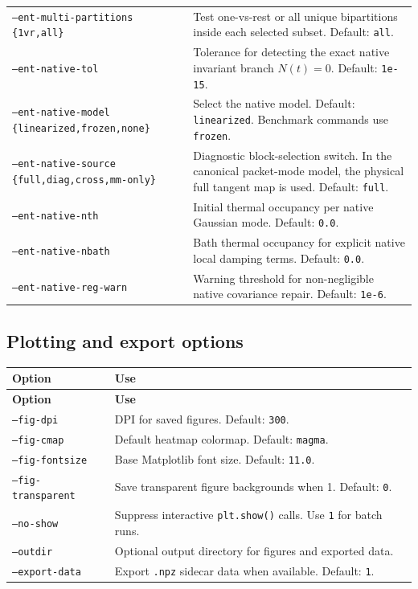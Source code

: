 \documentclass[11pt]{article}
\begin{document}
\begin{longtable}{L{0.31\textwidth}L{0.61\textwidth}}
\texttt{--ent-multi-partitions \{1vr,all\}} & Test one-vs-rest or all unique bipartitions inside each selected subset. Default: \texttt{all}. \\
\texttt{--ent-native-tol} & Tolerance for detecting the exact native invariant branch \(N(t)=0\). Default: \texttt{1e-15}. \\
\texttt{--ent-native-model \{linearized,frozen,none\}} & Select the native model. Default: \texttt{linearized}. Benchmark commands use \texttt{frozen}. \\
\texttt{--ent-native-source \{full,diag,cross,mm-only\}} & Diagnostic block-selection switch. In the canonical packet-mode model, the physical full tangent map is used. Default: \texttt{full}. \\
\texttt{--ent-native-nth} & Initial thermal occupancy per native Gaussian mode. Default: \texttt{0.0}. \\
\texttt{--ent-native-nbath} & Bath thermal occupancy for explicit native local damping terms. Default: \texttt{0.0}. \\
\texttt{--ent-native-reg-warn} & Warning threshold for non-negligible native covariance repair. Default: \texttt{1e-6}. \\
\bottomrule
\end{longtable}

\subsection{Plotting and export options}
\begin{longtable}{L{0.28\textwidth}L{0.64\textwidth}}
\toprule
\textbf{Option} & \textbf{Use} \\
\midrule
\endfirsthead
\toprule
\textbf{Option} & \textbf{Use} \\
\midrule
\endhead
\texttt{--fig-dpi} & DPI for saved figures. Default: \texttt{300}. \\
\texttt{--fig-cmap} & Default heatmap colormap. Default: \texttt{magma}. \\
\texttt{--fig-fontsize} & Base Matplotlib font size. Default: \texttt{11.0}. \\
\texttt{--fig-transparent} & Save transparent figure backgrounds when 1. Default: \texttt{0}. \\
\texttt{--no-show} & Suppress interactive \texttt{plt.show()} calls. Use \texttt{1} for batch runs. \\
\texttt{--outdir} & Optional output directory for figures and exported data. \\
\texttt{--export-data} & Export \texttt{.npz} sidecar data when available. Default: \texttt{1}. \\
\bottomrule
\end{longtable}
\end{document}
